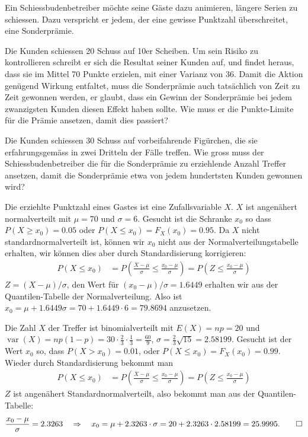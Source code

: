 Ein Schiessbudenbetreiber möchte seine Gäste dazu animieren,
längere Serien zu schiessen. Dazu verspricht er jedem, der eine
gewisse Punktzahl überschreitet, eine Sonderprämie.
\begin{teilaufgaben}
\item
Die Kunden schiessen 20 Schuss auf 10er Scheiben. Um sein Risiko
zu kontrollieren schreibt er sich die Resultat seiner Kunden auf,
und findet heraus, dass sie im Mittel 70 Punkte erzielen, mit einer
Varianz von 36. Damit die Aktion genügend Wirkung entfaltet,
muss die Sonderprämie auch tatsächlich von Zeit zu Zeit
gewonnen werden, er glaubt, dass ein Gewinn der Sonderprämie
bei jedem zwanzigsten Kunden diesen Effekt haben sollte. Wie
muss er die Punkte-Limite für die Prämie ansetzen, damit dies
passiert?
\item
Die Kunden schiessen 30 Schuss auf vorbeifahrende Figürchen, die
sie erfahrungsgemäss in zwei Dritteln der Fälle treffen. Wie
gross muss der Schiessbudenbetreiber die für die Sonderprämie
zu erziehlende Anzahl Treffer ansetzen, damit die Sonderprämie
etwa von jedem hundertsten Kunden gewonnen wird?
\end{teilaufgaben}


\begin{loesung}
\begin{teilaufgaben}
\item
Die erziehlte Punktzahl eines Gastes ist eine Zufallsvariable $X$.
$X$ ist angenähert normalverteilt mit $\mu=70$ und
$\sigma=6$. Gesucht ist die Schranke $x_0$ so dass
$P(X\ge x_0)=0.05$ oder $P(X\le x_0)=F_X(x_0)=0.95$.
Da $X$ nicht standardnormalverteilt ist, können wir $x_0$ nicht
aus der Normalverteilungstabelle erhalten, wir können dies aber
durch Standardisierung korrigieren:
\begin{align*}
P(X\le x_0)
&=
P\left(\frac{X-\mu}{\sigma}\le\frac{x_0-\mu}{\sigma}\right)
=
P\left(Z\le \frac{x_0-\mu}{\sigma}\right)
\end{align*}
$Z=(X-\mu)/\sigma$, den Wert für $(x_0-\mu)/\sigma=1.6449$ erhalten
wir aus der Quantilen-Tabelle der Normalverteilung. Also ist
$x_0=\mu +1.6449\sigma=70 + 1.6449\cdot 6=79.8694$ anzusetzen.
\item
Die Zahl $X$ der Treffer ist binomialverteilt mit $E(X) = np=20$ und
$\operatorname{var}(X)=np(1-p)=30\cdot\frac23\cdot\frac13=\frac{60}{9}$,
$\sigma = \frac23\sqrt{15}=2.58199$.
Gesucht ist der Wert $x_0$ so, dass $P(X>x_0)=0.01$, oder
$P(X\le x_0)=F_X(x_0)=0.99$. Wieder durch Standardisierung bekommt
man
\begin{align*}
P(X\le x_0)
&=
P\left(
\frac{X-\mu}{\sigma}\le\frac{x_0-\mu}{\sigma}
\right)
=
P\left(
Z\le \frac{x_0-\mu}{\sigma}
\right)
\end{align*}
$Z$ ist angenähert Standardnormalverteilt, also bekommt man aus
der Quantilen-Tabelle:
\[
\frac{x_0-\mu}{\sigma}=2.3263
\quad
\Rightarrow
\quad
x_0=\mu+2.3263\cdot \sigma=20 + 2.3263\cdot 2.58199 = 25.9995.
\qedhere
\]
\end{teilaufgaben}
\end{loesung}

